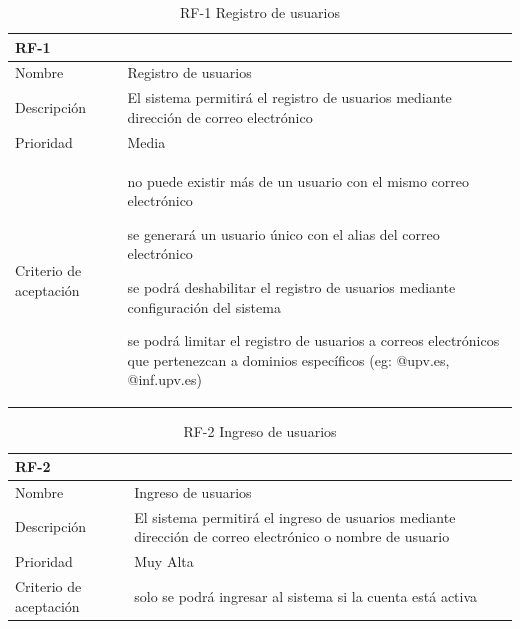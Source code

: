 \documentclass[11pt,spanish,listoffigures,listoftables]{tfgetsinf}
\begin{document}
\begin{table}[!ht]
	\centering
	\begin{tabular}{ |p{4cm}||p{10cm}|  }
		\multicolumn{2}{l}{\textbf{RF-1}} \\
		\hline
		Nombre & Registro de usuarios\\
		\hline
		Descripción & El sistema permitirá el registro de usuarios mediante dirección de correo electrónico   \\
		\hline
		Prioridad & Media\\
		\hline
		Criterio de aceptación & 
		\begin{tabitem}
			\item no puede existir más de un usuario con el mismo correo electrónico
			\item se generará un usuario único con el alias del correo electrónico
			\item se podrá deshabilitar el registro de usuarios mediante configuración del sistema
			\item se podrá limitar el registro de usuarios a correos electrónicos que pertenezcan a dominios específicos (eg: @upv.es, @inf.upv.es)
		\end{tabitem} \\
		\hline
	\end{tabular}
	\caption{RF-1 Registro de usuarios}
	\label{table:1}
\end{table}

\begin{table}[!ht]
	\centering
	\begin{tabular}{ |p{4cm}||p{10cm}|  }
		\multicolumn{2}{l}{\textbf{RF-2}} \\
		\hline
		Nombre & Ingreso de usuarios\\
		\hline
		Descripción & El sistema permitirá el ingreso de usuarios mediante dirección de correo electrónico o nombre de usuario  \\
		\hline
		Prioridad & Muy Alta\\
		\hline
		Criterio de aceptación & 
			solo se podrá ingresar al sistema si la cuenta está activa \\
		\hline
	\end{tabular}
	\caption{RF-2 Ingreso de usuarios}
	\label{table:2}
\end{table}
\end{document}
